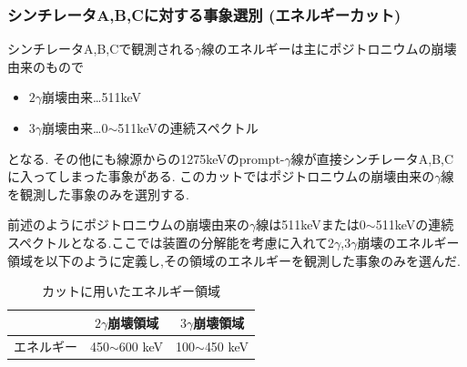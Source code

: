 \subsubsection{シンチレータA,B,Cに対する事象選別 (エネルギーカット)}
シンチレータA,B,Cで観測される$\gamma$線のエネルギーは主にポジトロニウムの崩壊由来のもので
\begin{itemize}
		\item $2\gamma$崩壊由来…511keV
		\item $3\gamma$崩壊由来…0$\sim$511keVの連続スペクトル
\end{itemize}
となる.
その他にも線源からの1275keVのprompt-$\gamma$線が直接シンチレータA,B,Cに入ってしまった事象がある.
このカットではポジトロニウムの崩壊由来の$\gamma$線を観測した事象のみを選別する.

前述のようにポジトロニウムの崩壊由来の$\gamma$線は511keVまたは0$\sim$511keVの連続スペクトルとなる.ここでは装置の分解能を考慮に入れて2$\gamma$,3$\gamma$崩壊のエネルギー領域を以下のように定義し,その領域のエネルギーを観測した事象のみを選んだ.
\begin{table}[htbp]
	\centering
		\caption{カットに用いたエネルギー領域}
		\begin{tabular}{|l|c|c|} \hline
			 & $2\gamma$崩壊領域 & $3\gamma$崩壊領域 \\ \hline
			エネルギー & 450$\sim$600 keV & 100$\sim$450 keV\\ \hline
		\end{tabular}
		\label{energy_cut_region}
\end{table}

